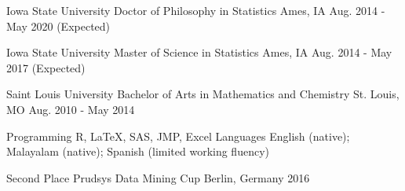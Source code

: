 \documentclass[11pt, a4paper]{awesome-cv}
\begin{document}
\makecvheader

\vspace{1mm}
\begin{cventries}
    \cventry
    {Iowa State University}
    {Doctor of Philosophy in Statistics}
    {Ames, IA}
    {Aug. 2014 - May 2020 (Expected)}
    {
    }
  \end{cventries}
  \vspace*{-\baselineskip}
  \begin{cventries}
    \cventry
    {Iowa State University}
    {Master of Science in Statistics}
    {Ames, IA}
    {Aug. 2014 - May 2017 (Expected)}
    {
    }
  \end{cventries}
  \vspace*{-\baselineskip}
  \begin{cventries}
  \cventry
    {Saint Louis University}
    {Bachelor of Arts in Mathematics and Chemistry}
    {St. Louis, MO}
    {Aug. 2010 - May 2014}
    {
    }
\end{cventries}
\vspace*{-\baselineskip}



\begin{cvskills}
  \cvskill
    {Programming} %
    {R, LaTeX, SAS, JMP, Excel} %
  \cvskill
    {Languages} %
    {English (native); Malayalam (native); Spanish (limited working fluency)} %
\end{cvskills} 

\begin{cvhonors}
  \cvhonor
    {Second Place}
    {Prudsys Data Mining Cup}
    {Berlin, Germany}
    {2016}
 \end{cvhonors}
\end{document}
